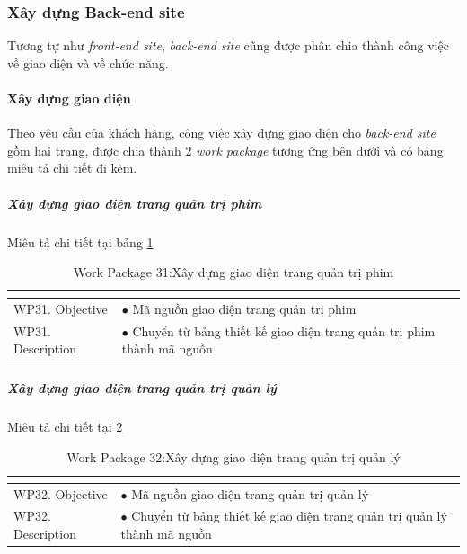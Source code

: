 \documentclass[a4paper]{book}
\begin{document}
\subsubsection{Xây dựng Back-end site}
Tương tự như \textit{front-end site}, \textit{back-end site} cũng được phân chia thành công việc về giao diện và về chức năng.
\paragraph{Xây dựng giao diện}
Theo yêu cầu của khách hàng, công việc xây dựng giao diện cho \textit{back-end site} gồm hai trang, được chia thành 2 \textit{work package} tương ứng bên dưới và có bảng miêu tả chi tiết đi kèm.
\subparagraph{Xây dựng giao diện trang quản trị phim} Miêu tả chi tiết tại bảng \ref{table:backend_xd_gd_phim}
\begin{table}[h!]
	\begin{center}
		\begin{tabular}{|p{4cm}|p{10cm}|}
			\hline
			\multicolumn{2}{|c|}{\cellcolor[HTML]{363636}{\color[HTML]{FFFFFF}Work package 31: Xây dựng giao diện trang quản trị phim}}\\
			\hline
			\multirow{1}{*}{WP31. Objective} & $\bullet$ Mã nguồn giao diện trang quản trị phim\\
			\hline
			\multirow{1}{*}{WP31. Description} & $\bullet$ Chuyển từ bảng thiết kế giao diện trang quản trị phim thành mã nguồn \\
			\hline
		\end{tabular}
		\caption{Work Package 31:Xây dựng giao diện trang quản trị phim}
		\label{table:backend_xd_gd_phim}
	\end{center}
\end{table}
\subparagraph{Xây dựng giao diện trang quản trị quản lý} Miêu tả chi tiết tại \ref{table:backend_xd_gd_quanly}
\begin{table}[h!]
	\begin{center}
		\begin{tabular}{|p{4cm}|p{10cm}|}
			\hline
			\multicolumn{2}{|c|}{\cellcolor[HTML]{363636}{\color[HTML]{FFFFFF}Work package 32: Xây dựng giao diện trang quản trị quản lý}}\\
			\hline
			\multirow{1}{*}{WP32. Objective} & $\bullet$ Mã nguồn giao diện trang quản trị quản lý\\
			\hline
			\multirow{1}{*}{WP32. Description} & $\bullet$ Chuyển từ bảng thiết kế giao diện trang quản trị quản lý thành mã nguồn \\
			\hline
		\end{tabular}
		\caption{Work Package 32:Xây dựng giao diện trang quản trị quản lý}
		\label{table:backend_xd_gd_quanly}
	\end{center}
\end{table}
\end{document}
